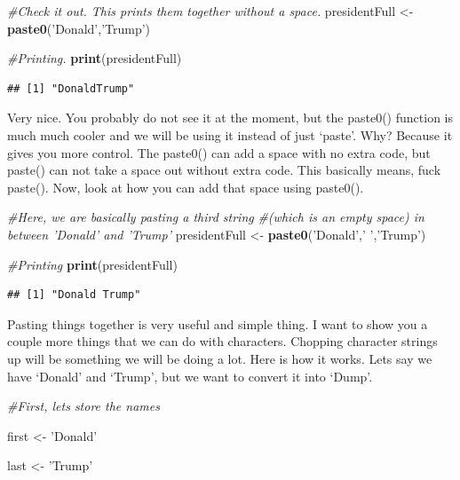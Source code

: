 \documentclass[]{book}
\newenvironment{Shaded}{\begin{snugshade}}{\end{snugshade}}
\newcommand{\CommentTok}[1]{\textcolor[rgb]{0.56,0.35,0.01}{\textit{#1}}}
\newcommand{\KeywordTok}[1]{\textcolor[rgb]{0.13,0.29,0.53}{\textbf{#1}}}
\newcommand{\NormalTok}[1]{#1}
\newcommand{\StringTok}[1]{\textcolor[rgb]{0.31,0.60,0.02}{#1}}
\begin{document}
\begin{Shaded}
\begin{Highlighting}[]
\CommentTok{#Check it out. This prints them together without a space.}
\NormalTok{presidentFull <-}\StringTok{ }\KeywordTok{paste0}\NormalTok{(}\StringTok{'Donald'}\NormalTok{,}\StringTok{'Trump'}\NormalTok{)}

\CommentTok{#Printing.}
\KeywordTok{print}\NormalTok{(presidentFull)}
\end{Highlighting}
\end{Shaded}

\begin{verbatim}
## [1] "DonaldTrump"
\end{verbatim}

Very nice. You probably do not see it at the moment, but the paste0() function is much much cooler and we will be using it instead of just `paste'. Why? Because it gives you more control. The paste0() can add a space with no extra code, but paste() can not take a space out without extra code. This basically means, fuck paste(). Now, look at how you can add that space using paste0().

\begin{Shaded}
\begin{Highlighting}[]
\CommentTok{#Here, we are basically pasting a third string }
\CommentTok{#(which is an empty space) in between 'Donald' and 'Trump'}
\NormalTok{presidentFull <-}\StringTok{ }\KeywordTok{paste0}\NormalTok{(}\StringTok{'Donald'}\NormalTok{,}\StringTok{' '}\NormalTok{,}\StringTok{'Trump'}\NormalTok{)}

\CommentTok{#Printing}
\KeywordTok{print}\NormalTok{(presidentFull)}
\end{Highlighting}
\end{Shaded}

\begin{verbatim}
## [1] "Donald Trump"
\end{verbatim}

Pasting things together is very useful and simple thing. I want to show you a couple more things that we can do with characters. Chopping character strings up will be something we will be doing a lot. Here is how it works. Lets say we have `Donald' and `Trump', but we want to convert it into `Dump'.

\begin{Shaded}
\begin{Highlighting}[]
\CommentTok{#First, lets store the names}

\NormalTok{first <-}\StringTok{ 'Donald'}

\NormalTok{last <-}\StringTok{ 'Trump'}
\end{Highlighting}
\end{Shaded}
\end{document}
